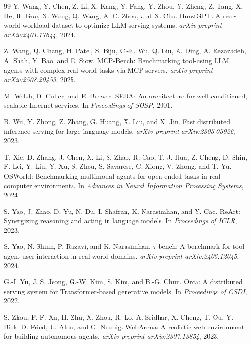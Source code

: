 \documentclass[5p,times]{elsarticle}
\begin{document}
\begin{thebibliography}{99}
Y. Wang, Y. Chen, Z. Li, X. Kang, Y. Fang, Y. Zhou, Y. Zheng, Z. Tang, X. He, R. Guo, X. Wang, Q. Wang, A. C. Zhou, and X. Chu.
\newblock BurstGPT: A real-world workload dataset to optimize LLM serving systems.
\newblock \emph{arXiv preprint arXiv:2401.17644}, 2024.

Z. Wang, Q. Chang, H. Patel, S. Biju, C.-E. Wu, Q. Liu, A. Ding, A. Rezazadeh, A. Shah, Y. Bao, and E. Siow.
\newblock MCP-Bench: Benchmarking tool-using LLM agents with complex real-world tasks via MCP servers.
\newblock \emph{arXiv preprint arXiv:2508.20453}, 2025.

M. Welsh, D. Culler, and E. Brewer.
\newblock SEDA: An architecture for well-conditioned, scalable Internet services.
\newblock In \emph{Proceedings of SOSP}, 2001.

B. Wu, Y. Zhong, Z. Zhang, G. Huang, X. Liu, and X. Jin.
\newblock Fast distributed inference serving for large language models.
\newblock \emph{arXiv preprint arXiv:2305.05920}, 2023.

T. Xie, D. Zhang, J. Chen, X. Li, S. Zhao, R. Cao, T. J. Hua, Z. Cheng, D. Shin, F. Lei, Y. Liu, Y. Xu, S. Zhou, S. Savarese, C. Xiong, V. Zhong, and T. Yu.
\newblock OSWorld: Benchmarking multimodal agents for open-ended tasks in real computer environments.
\newblock In \emph{Advances in Neural Information Processing Systems}, 2024.

S. Yao, J. Zhao, D. Yu, N. Du, I. Shafran, K. Narasimhan, and Y. Cao.
\newblock ReAct: Synergizing reasoning and acting in language models.
\newblock In \emph{Proceedings of ICLR}, 2023.

S. Yao, N. Shinn, P. Razavi, and K. Narasimhan.
\newblock $\tau$-bench: A benchmark for tool-agent-user interaction in real-world domains.
\newblock \emph{arXiv preprint arXiv:2406.12045}, 2024.

G.-I. Yu, J. S. Jeong, G.-W. Kim, S. Kim, and B.-G. Chun.
\newblock Orca: A distributed serving system for Transformer-based generative models.
\newblock In \emph{Proceedings of OSDI}, 2022.

S. Zhou, F. F. Xu, H. Zhu, X. Zhou, R. Lo, A. Sridhar, X. Cheng, T. Ou, Y. Bisk, D. Fried, U. Alon, and G. Neubig.
\newblock WebArena: A realistic web environment for building autonomous agents.
\newblock \emph{arXiv preprint arXiv:2307.13854}, 2023.

\end{thebibliography}
\end{document}
